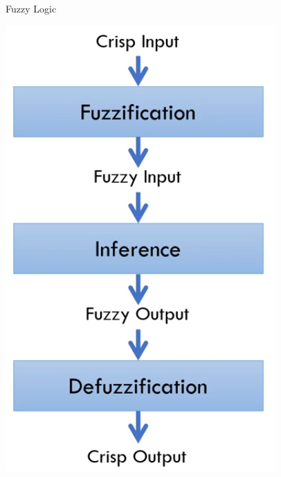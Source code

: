 \documentclass[pdflatex,compress,mathserif]{beamer}
\begin{document}
\begin{frame}{Fuzzy Logic}
	\begin{center}
		\includegraphics[height=0.8\textheight]{img/22}
	\end{center}
\end{frame}
\end{document}
